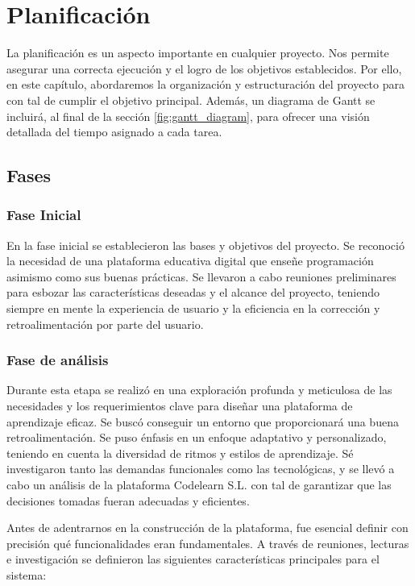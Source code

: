 \chapter{Planificación} \label{chap:planification}

La planificación es un aspecto importante en cualquier proyecto. Nos permite asegurar una correcta ejecución y el logro de los objetivos establecidos. Por ello, en este capítulo, abordaremos la organización y estructuración del proyecto para con tal de cumplir el objetivo principal. Además, un diagrama de Gantt se incluirá, al final de la sección \ref{fig:gantt_diagram}, para ofrecer una visión detallada del tiempo asignado a cada tarea.

\section{Fases}

\subsection{Fase Inicial}

En la fase inicial se establecieron las bases y objetivos del proyecto. Se reconoció la necesidad de una plataforma educativa digital que enseñe programación asimismo como sus buenas prácticas. Se llevaron a cabo reuniones preliminares para esbozar las características deseadas y el alcance del proyecto, teniendo siempre en mente la experiencia de usuario y la eficiencia en la corrección y retroalimentación por parte del usuario.

\subsection{Fase de análisis}

Durante esta etapa se realizó en una exploración profunda y meticulosa de las necesidades y los requerimientos clave para diseñar una plataforma de aprendizaje eficaz. Se buscó conseguir un entorno que proporcionará una buena retroalimentación. Se puso énfasis en un enfoque adaptativo y personalizado, teniendo en cuenta la diversidad de ritmos y estilos de aprendizaje. Sé investigaron tanto las demandas funcionales como las tecnológicas, y se llevó a cabo un análisis de la plataforma Codelearn S.L. con tal de garantizar que las decisiones tomadas fueran adecuadas y eficientes.

Antes de adentrarnos en la construcción de la plataforma, fue esencial definir con precisión qué funcionalidades eran fundamentales. A través de reuniones, lecturas e investigación se definieron las siguientes características principales para el sistema:

